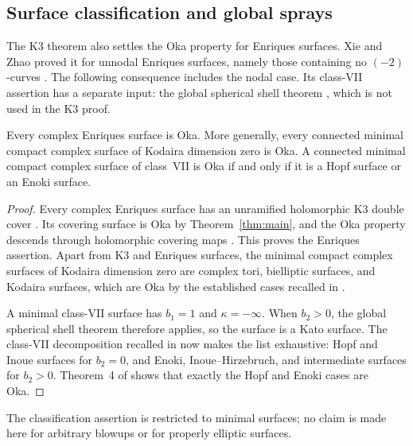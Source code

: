 \subsection{Surface classification and global sprays}
\label{sec:surface-consequences}

The K3 theorem also settles the Oka property for Enriques surfaces.
Xie and Zhao proved it for unnodal Enriques surfaces, namely those
containing no $(-2)$-curves \cite[Theorem~C and Corollary~3.5]{XieZhao}.
The following consequence includes the nodal case. Its class-VII
assertion has a separate input: the global spherical shell theorem
\cite[Theorem~1.1]{OpenAIGSS}, which is not used in the K3 proof.

\begin{corollary}
\label{cor:surface-classification}
Every complex Enriques surface is Oka. More generally, every connected
minimal compact complex surface of Kodaira dimension zero is Oka.
A connected minimal compact complex surface of class~VII is Oka if and
only if it is a Hopf surface or an Enoki surface.
\end{corollary}

\begin{proof}
Every complex Enriques surface has an unramified holomorphic K3 double cover
\cite[Introduction]{GallegoGonzalezPurnaprajna}. Its covering surface
is Oka by Theorem~\ref{thm:main}, and the Oka property descends through
holomorphic covering maps \cite[Introduction]{ForstnericLarussonSurfaces}.
This proves the Enriques assertion. Apart from K3 and Enriques surfaces,
the minimal compact complex surfaces of Kodaira dimension zero are
complex tori, bielliptic surfaces, and Kodaira surfaces, which are Oka
by the established cases recalled in
\cite[Introduction]{ForstnericLarussonSurfaces}.

A minimal class-VII surface has $b_1=1$ and $\kappa=-\infty$. When
$b_2>0$, the global spherical shell theorem
\cite[Theorem~1.1]{OpenAIGSS} therefore applies, so the surface is a
Kato surface. The class-VII decomposition recalled in
\cite[Introduction]{ForstnericLarussonSurfaces} now makes the list
exhaustive: Hopf and Inoue surfaces for $b_2=0$, and Enoki,
Inoue--Hirzebruch, and intermediate surfaces for $b_2>0$.
Theorem~4 of \cite{ForstnericLarussonSurfaces} shows that exactly the
Hopf and Enoki cases are Oka.
\end{proof}

The classification assertion is restricted to minimal surfaces; no
claim is made here for arbitrary blowups or for properly elliptic
surfaces.

